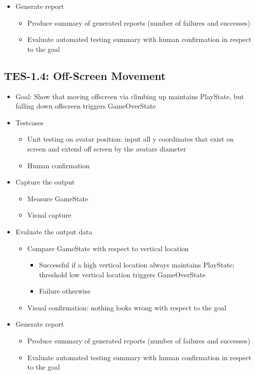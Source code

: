 \begin{itemize}
\item Generate report
\begin{itemize}
\item Produce summary of generated reports (number of failures and successes)
\item Evaluate automated testing summary with human confirmation in respect to the goal
\end{itemize}
\end{itemize}

\subsection{TES-1.4: Off-Screen Movement}
\label{subsec:offscreen}
\begin{itemize}
\item Goal: Show that moving offscreen via climbing up maintains PlayState, but falling down offscreen triggers GameOverState

\item Testcases
\begin{itemize}
\item Unit testing on avatar position: input all y coordinates that exist on screen and extend off screen by the avatars diameter
\item Human confirmation
\end{itemize}

\item Capture the output
\begin{itemize}
\item Measure GameState
\item Visual capture
\end{itemize}

\item Evaluate the output data
\begin{itemize}
\item Compare GameState with respect to vertical location
\begin{itemize}
\item Successful if a high vertical location always maintains PlayState; threshold low vertical location triggers GameOverState
\item Failure otherwise
\end{itemize}
\item Visual confirmation: nothing looks wrong with respect to the goal
\end{itemize}

\item Generate report
\begin{itemize}
\item Produce summary of generated reports (number of failures and successes)
\item Evaluate automated testing summary with human confirmation in respect to the goal
\end{itemize}
\end{itemize}

